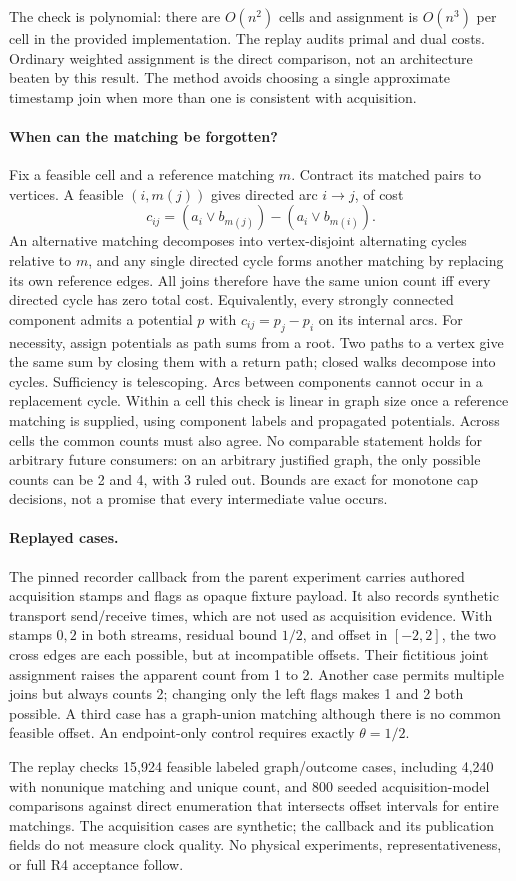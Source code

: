\documentclass[11pt]{article}
\begin{document}
The check is polynomial: there are \(O(n^2)\) cells and assignment
is \(O(n^3)\) per cell in the provided implementation. The replay
audits primal and dual costs. Ordinary weighted assignment is
the direct comparison, not an architecture beaten by this result.
The method avoids choosing a single approximate timestamp join
when more than one is consistent with acquisition.

\paragraph{When can the matching be forgotten?}
Fix a feasible cell and a reference matching \(m\). Contract its
matched pairs to vertices. A feasible \((i,m(j))\) gives directed
arc \(i\to j\), of cost
\[
                    c_{ij}=(a_i\lor b_{m(j)})-(a_i\lor b_{m(i)}).
\]
An alternative matching decomposes into vertex-disjoint alternating
cycles relative to \(m\), and any single directed cycle forms another
matching by replacing its own reference edges. All joins therefore
have the same union count iff every directed cycle has zero total
cost. Equivalently, every strongly connected component admits a
potential \(p\) with \(c_{ij}=p_j-p_i\) on its internal arcs. For
necessity, assign potentials as path sums from a root. Two paths
to a vertex give the same sum by closing them with a return path;
closed walks decompose into cycles. Sufficiency is telescoping.
Arcs between components cannot occur in a replacement cycle.
Within a cell this check is linear in graph size once a reference
matching is supplied, using component labels and propagated
potentials. Across cells the common counts must also agree.
No comparable statement holds for arbitrary future consumers:
on an arbitrary justified graph, the only possible counts can
be 2 and 4, with 3 ruled out. Bounds are exact for monotone cap
decisions, not a promise that every intermediate value occurs.

\paragraph{Replayed cases.}
The pinned recorder callback from the parent experiment carries
authored acquisition stamps and flags as opaque fixture payload.
It also records synthetic transport send/receive times, which
are not used as acquisition evidence. With stamps \(0,2\) in both
streams, residual bound \(1/2\), and offset in \([-2,2]\), the two
cross edges are each possible, but at incompatible offsets.
Their fictitious joint assignment raises the apparent count from
1 to 2. Another case permits multiple joins but always counts
2; changing only the left flags makes 1 and 2 both possible.
A third case has a graph-union matching although there is no
common feasible offset. An endpoint-only control requires exactly
\(\theta=1/2\).

The replay checks 15,924 feasible labeled graph/outcome cases,
including 4,240 with nonunique matching and unique count, and 800
seeded acquisition-model comparisons against direct enumeration
that intersects offset intervals for entire matchings. The
acquisition cases are synthetic; the callback and its publication
fields do not measure clock quality. No physical experiments,
representativeness, or full R4 acceptance follow.
\end{document}
